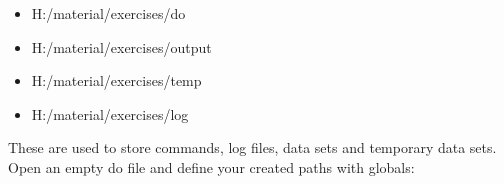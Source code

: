\documentclass[letterpaper,10pt,openany,onesideH,english]{sphinxmanual}
\begin{document}

\begin{figure}[H]
\centering

\noindent{}
\end{figure}

\begin{itemize}
\item {} 
H:/material/exercises/do

\item {} 
H:/material/exercises/output

\item {} 
H:/material/exercises/temp

\item {} 
H:/material/exercises/log

\end{itemize}

These are used to store commands, log files, data sets and temporary data sets.
Open an empty do file and define your created paths with globals:
\end{document}
